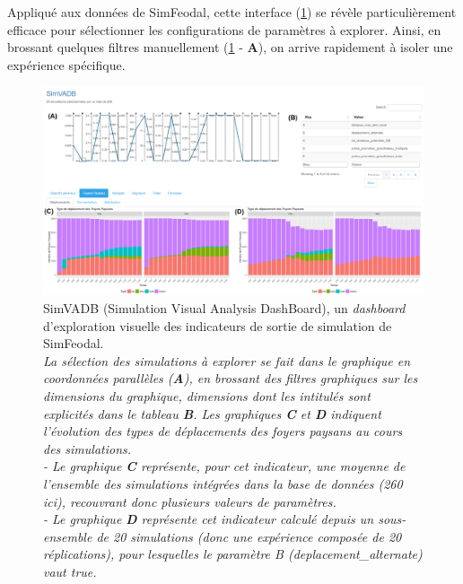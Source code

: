 Appliqué aux données de SimFeodal, cette interface (\cref{fig:simvadb_dashboard}) se révèle particulièrement efficace pour sélectionner les configurations de paramètres à explorer.
Ainsi, en \og brossant \fg{} quelques filtres manuellement (\cref{fig:simvadb_dashboard} - \textbf{A}), on arrive rapidement à isoler une expérience spécifique.

\begin{figure}[H]
	\captionsetup{width=\linewidth}
	\includegraphics[width=\linewidth]{img/SimVADB_Dashboard2_annote_retouche.png}
	\caption[SimVADB, un \textit{dashboard} d'exploration visuelle des indicateurs de sortie de simulation de SimFeodal.]{SimVADB (Simulation Visual Analysis DashBoard), un \textit{dashboard} d'exploration visuelle des indicateurs de sortie de simulation de SimFeodal.\\
	\textit{La sélection des simulations à explorer se fait dans le graphique en coordonnées parallèles (\textbf{A}), en \og brossant\fg{} des filtres graphiques sur les \og dimensions\fg{} du graphique, dimensions dont les intitulés sont explicités dans le tableau \textbf{B}.
	Les graphiques \textbf{C} et \textbf{D} indiquent l'évolution des types de déplacements des foyers paysans au cours des simulations.\\
	- Le graphique \textbf{C} représente, pour cet indicateur, une moyenne de l'ensemble des simulations intégrées dans la base de données (260 ici), recouvrant donc plusieurs valeurs de paramètres.\\
	- Le graphique \textbf{D} représente cet indicateur calculé depuis un sous-ensemble de 20 simulations (donc une expérience composée de 20 réplications), pour lesquelles le paramètre \og \textsf{B} \fg{} (\textsf{deplacement\_alternate}) vaut \textsf{true}.}}
	\label{fig:simvadb_dashboard}
\end{figure}

